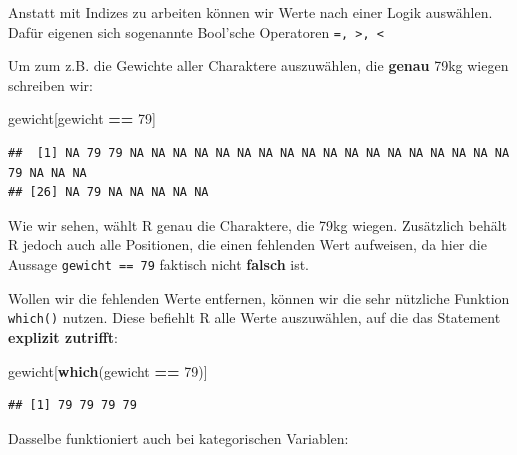 \documentclass[
]{book}
\newenvironment{Shaded}{\begin{snugshade}}{\end{snugshade}}
\newcommand{\DecValTok}[1]{\textcolor[rgb]{0.00,0.00,0.81}{#1}}
\newcommand{\FunctionTok}[1]{\textcolor[rgb]{0.13,0.29,0.53}{\textbf{#1}}}
\newcommand{\NormalTok}[1]{#1}
\newcommand{\OtherTok}[1]{\textcolor[rgb]{0.56,0.35,0.01}{#1}}
\newcommand{\SpecialCharTok}[1]{\textcolor[rgb]{0.81,0.36,0.00}{\textbf{#1}}}
\begin{document}
Anstatt mit Indizes zu arbeiten können wir Werte nach einer Logik auswählen. Dafür eigenen sich sogenannte Bool'sche Operatoren \texttt{=,\ \textgreater{},\ \textless{}}

Um zum z.B. die Gewichte aller Charaktere auszuwählen, die \textbf{genau} 79kg wiegen schreiben wir:

\begin{Shaded}
\begin{Highlighting}[]
\NormalTok{gewicht[gewicht }\SpecialCharTok{==} \DecValTok{79}\NormalTok{]}
\end{Highlighting}
\end{Shaded}

\begin{verbatim}
##  [1] NA 79 79 NA NA NA NA NA NA NA NA NA NA NA NA NA NA NA NA NA NA 79 NA NA NA
## [26] NA 79 NA NA NA NA NA
\end{verbatim}

Wie wir sehen, wählt R genau die Charaktere, die 79kg wiegen. Zusätzlich behält R jedoch auch alle Positionen, die einen fehlenden Wert aufweisen, da hier die Aussage \texttt{gewicht\ ==\ 79} faktisch nicht \textbf{falsch} ist.

Wollen wir die fehlenden Werte entfernen, können wir die sehr nützliche Funktion \texttt{which()} nutzen. Diese befiehlt R alle Werte auszuwählen, auf die das Statement \textbf{explizit zutrifft}:

\begin{Shaded}
\begin{Highlighting}[]
\NormalTok{gewicht[}\FunctionTok{which}\NormalTok{(gewicht }\SpecialCharTok{==} \DecValTok{79}\NormalTok{)]}
\end{Highlighting}
\end{Shaded}

\begin{verbatim}
## [1] 79 79 79 79
\end{verbatim}

Dasselbe funktioniert auch bei kategorischen Variablen:

\begin{Shaded}
\end{Shaded}
\end{document}
